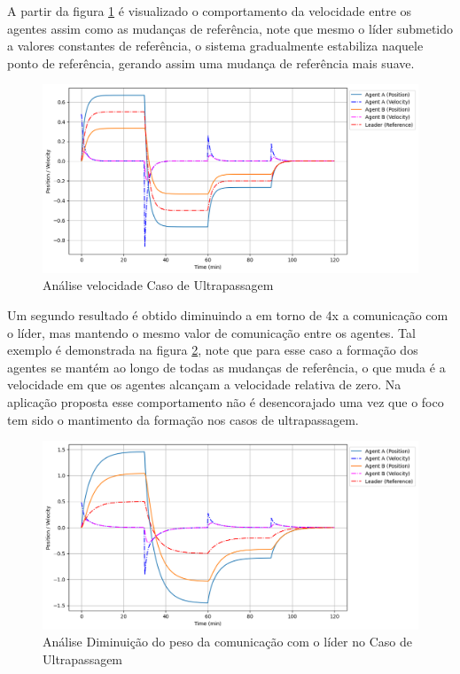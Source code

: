A partir da figura \ref{fig:case1_fig2} é visualizado o comportamento da velocidade entre os agentes assim como as mudanças de referência, note que mesmo o líder submetido a valores constantes de referência, o sistema gradualmente estabiliza naquele ponto de referência, gerando assim uma mudança de referência mais suave.
\begin{figure}[ht]
    \centering
    \caption{Análise velocidade Caso de Ultrapassagem}
    \label{fig:case1_fig2}
    \includegraphics[width=1\linewidth]{figures/Simulation/Cooperativo/case1_fg2.png}
\end{figure}

Um segundo resultado é obtido diminuindo a em torno de 4x a comunicação com o líder, mas mantendo o mesmo valor de comunicação entre os agentes. Tal exemplo é demonstrada na figura \ref{fig:case2_fig2}, note que para esse caso a formação dos agentes se mantém ao longo de todas as mudanças de referência, o que muda é a velocidade em que os agentes alcançam a velocidade relativa de zero. Na aplicação proposta esse comportamento não é desencorajado uma vez que o foco tem sido o mantimento da formação nos casos de ultrapassagem.

\begin{figure}[ht]
    \centering
    \caption{Análise Diminuição do peso da comunicação com o líder no Caso de Ultrapassagem}
    \label{fig:case2_fig2}
    \includegraphics[width=1\linewidth]{figures/Simulation/Cooperativo/case2_fg2.png}
\end{figure}

